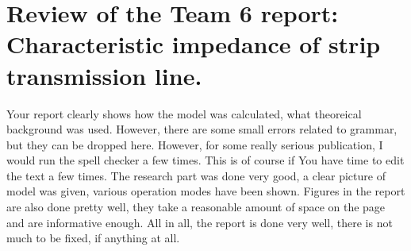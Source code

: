 \documentclass[a4paper, titlepage, 10pt]{article}
\begin{document}
\section{Review of the Team 6 report: \\ Characteristic impedance of strip transmission line.}
Your report clearly shows how the model was calculated, what theoreical background was used. However, there are some small errors related to grammar, but they can be dropped here. However, for some really serious publication, I would run the spell checker a few times. This is of course if You have time to edit the text a few times. The research part was done very good, a clear picture of model was given, various operation modes have been shown. Figures in the report are also done pretty well, they take a reasonable amount of space on the page and are informative enough. All in all, the report is done very well, there is not much to be fixed, if anything at all.
\end{document}
